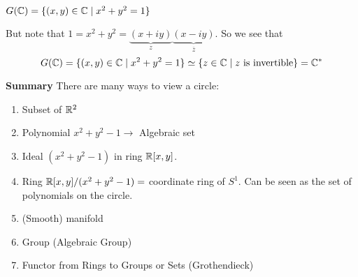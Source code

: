 \begin{example}
    $G(\mathbb{C}) = \{(x,y)\in\mathbb{C} \mid x^2+y^2 = 1\}$
\end{example} 

But note that $1 = x^2+y^2 = {\underbrace{(x+iy)}_z}{\underbrace{(x-iy)}_{\overline{z}}}$. So we see that \begin{equation}
    G(\mathbb{C}) = \{(x,y)\in\mathbb{C} \mid x^2+y^2 = 1\}\simeq \{z\in \mathbb{C} \mid z\text{ is invertible}\} = \mathbb{C}^\ast
\end{equation}

\textbf{Summary}
There are many ways to view a circle:\begin{enumerate}
    \item Subset of $\mathbb{R}^2$
    \item Polynomial $x^2+y^2-1 \rightarrow$   Algebraic set
    \item Ideal $(x^2+y^2-1)$ in ring $\mathbb{R}[x,y]$.
    \item Ring $\mathbb{R}[x,y]/(x^2+y^2-1) = $ coordinate ring of $S^1$. Can be seen as the set of polynomials on the circle.
    \item (Smooth) manifold
    \item Group (Algebraic Group)
    \item Functor from Rings to Groups or Sets (Grothendieck)
\end{enumerate}

